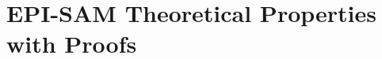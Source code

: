 \documentclass{article}
\theoremstyle{plain}
\theoremstyle{definition}
\theoremstyle{remark}
\theoremstyle{observation}
\newcommand{\eff}{\textit{eff}}
\newcommand{\iseff}{\textit{IsEff}}
\newcommand{\ispre}{\textit{IsPre}}
\begin{document}




\setcounter{AlgoLine}{0}
\section{EPI-SAM Theoretical Properties with Proofs}
\end{document}
